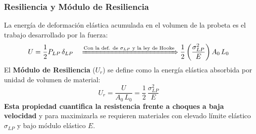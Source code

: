 \subsubsection{Resiliencia y Módulo de Resiliencia}

La energía de deformación elástica acumulada en el volumen de la probeta es el trabajo desarrollado por la fuerza:
\begin{equation}
    U = \frac{1}{2} P_{LP} \, \delta_{LP} \quad \xRightarrow{\text{Con la def. de }\sigma_{LP} \text{ y la ley de Hooke}} \frac{1}{2} \left(\frac{\sigma_{LP}^2}{E}\right) A_0 \, L_0
\end{equation}
El \textbf{Módulo de Resiliencia} ($U_r$) se define como la energía elástica absorbida por unidad de volumen de material:
\begin{equation}
    U_r = \frac{U}{A_0 \, L_0} = \frac{1}{2} \, \frac{\sigma_{LP}^2}{E}
    \label{eq:modulo_resiliencia}
\end{equation}
\textbf{Esta propiedad cuantifica la resistencia frente a choques a baja velocidad} y para maximizarla se requieren materiales con elevado límite elástico $\sigma_{LP}$ y bajo módulo elástico $E$.


